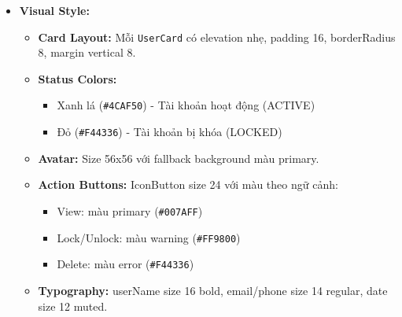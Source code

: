 \begin{itemize}
\begin{itemize}
            \item \textbf{Infinite Scroll:} \texttt{FlatList} gọi \texttt{fetchNextPage()} khi scroll đến cuối danh sách.
            \item \textbf{View Details:} Nhấn vào \texttt{UserCard} hoặc nút \texttt{eye} gọi \texttt{onUserPress(userId)} để xem chi tiết.
            \item \textbf{Lock/Unlock:} Nhấn nút khóa hiển thị \texttt{Dialog.confirm} xác nhận trước khi gọi \texttt{toggleUserStatusMutation}.
            \item \textbf{Delete Action:} Nhấn nút xóa hiển thị \texttt{Dialog.confirm} với cảnh báo nghiêm trọng trước khi gọi \texttt{deleteUserMutation}.
            \item \textbf{Pull-to-refresh:} \texttt{RefreshControl} cho phép kéo xuống để reload danh sách.
            \item \textbf{Empty State:} Hiển thị \texttt{EmptyState} khi không có kết quả tìm kiếm hoặc chưa có người dùng.
        \end{itemize}
    \item \textbf{Visual Style:}
        \begin{itemize}
            \item \textbf{Card Layout:} Mỗi \texttt{UserCard} có elevation nhẹ, padding 16, borderRadius 8, margin vertical 8.
            \item \textbf{Status Colors:}
                \begin{itemize}
                    \item Xanh lá (\texttt{\#4CAF50}) - Tài khoản hoạt động (ACTIVE)
                    \item Đỏ (\texttt{\#F44336}) - Tài khoản bị khóa (LOCKED)
                \end{itemize}
            \item \textbf{Avatar:} Size 56x56 với fallback background màu primary.
            \item \textbf{Action Buttons:} IconButton size 24 với màu theo ngữ cảnh:
                \begin{itemize}
                    \item View: màu primary (\texttt{\#007AFF})
                    \item Lock/Unlock: màu warning (\texttt{\#FF9800})
                    \item Delete: màu error (\texttt{\#F44336})
                \end{itemize}
            \item \textbf{Typography:} userName size 16 bold, email/phone size 14 regular, date size 12 muted.

\end{itemize}
\end{itemize}
